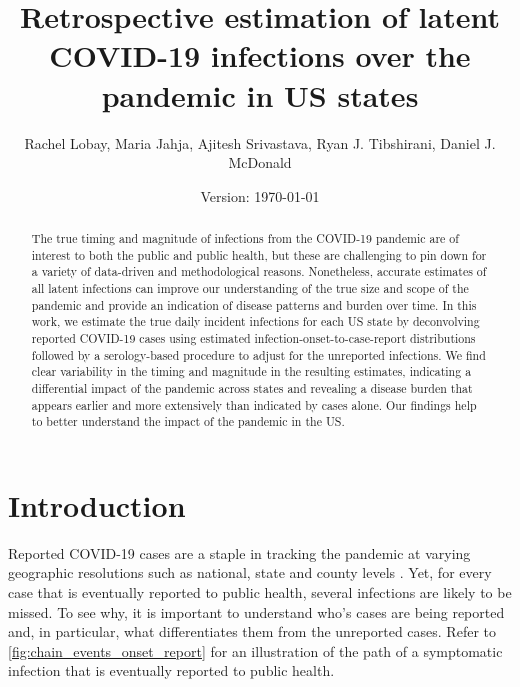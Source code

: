 \documentclass{article}
\begin{document}
\title{Retrospective estimation of latent COVID-19 infections over the pandemic in US states}
\author{Rachel Lobay, Maria Jahja, Ajitesh Srivastava, Ryan J. Tibshirani, Daniel J. McDonald}
\date{Version: \today}
\maketitle

\begin{abstract}
The true timing and magnitude of infections from the COVID-19 pandemic are of
interest to both the public and public health, but these are challenging to pin
down for a variety of data-driven and methodological reasons. Nonetheless, 
accurate estimates
of all latent infections can improve our understanding of the true size and
scope of the pandemic and provide an indication of disease patterns and burden
over time. In this work, we estimate the true daily incident infections for each
US state by deconvolving reported COVID-19 cases using estimated
infection-onset-to-case-report distributions followed by a serology-based
procedure to adjust for the unreported infections. We find clear
variability in the timing and magnitude in the resulting estimates, indicating a
differential impact of the pandemic across states and revealing a disease burden
that appears earlier and more extensively than indicated by cases alone. Our
findings help to better understand the impact of the pandemic in the US.
\end{abstract}

\section{Introduction}

Reported COVID-19 cases are a staple in tracking the pandemic at varying
geographic resolutions such as national, state and county levels
\citep{dong2020interactive, nyt2020corona, wp2020tracking}. Yet, for every case
that is eventually reported to public health, several infections are likely to
be missed. To see why, it is important to understand who's cases are being reported and,
in particular, what differentiates them from the unreported cases. Refer to
\autoref{fig:chain_events_onset_report} for an illustration of the path of a
symptomatic infection that is eventually reported to public health. 
\end{document}
